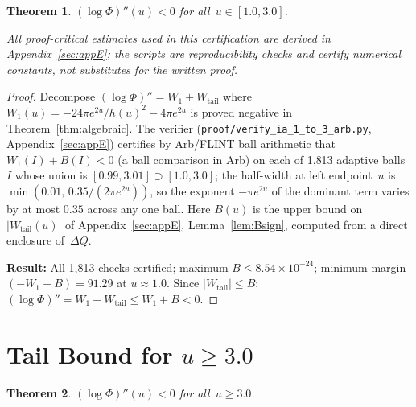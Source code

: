 \documentclass[11pt]{article}
\newtheorem{theorem}{Theorem}
\theoremstyle{definition}
\theoremstyle{remark}
\begin{document}
\begin{theorem}\label{thm:extended}
$(\log\Phi)''(u) < 0$ for all~$u \in [1.0, 3.0]$.

All proof-critical estimates used in this certification are derived in
Appendix~\ref{sec:appE}; the scripts are reproducibility checks and certify
numerical constants, not substitutes for the written proof.
\end{theorem}

\begin{proof}
Decompose $(\log\Phi)'' = W_1 + W_{\mathrm{tail}}$ where
$W_1(u) = -24\pi e^{2u}/h(u)^2 - 4\pi e^{2u}$ is proved negative in
Theorem~\ref{thm:algebraic}.
The verifier
(\texttt{proof/verify\_ia\_1\_to\_3\_arb.py}, Appendix~\ref{sec:appE})
certifies by Arb/FLINT ball arithmetic that
$W_1(I) + B(I) < 0$ (a ball comparison in Arb) on each of 1{,}813
adaptive balls~$I$ whose union is $[0.99,3.01]\supset[1.0,3.0]$;
the half-width at left endpoint~$u$ is
$\min(0.01,\, 0.35/(2\pi e^{2u}))$, so the exponent $-\pi e^{2u}$ of the
dominant term varies by at most $0.35$ across any one ball.
Here $B(u)$ is the upper bound on $|W_{\mathrm{tail}}(u)|$
of Appendix~\ref{sec:appE}, Lemma~\ref{lem:Bsign}, computed from a
direct enclosure of~$\Delta Q$.

\textbf{Result:} All 1{,}813 checks certified; maximum
$B \leq 8.54\times 10^{-24}$;
minimum margin $(-W_1 - B) = 91.29$ at $u\approx1.0$.
Since $|W_{\mathrm{tail}}|\leq B$:
$(\log\Phi)'' = W_1 + W_{\mathrm{tail}} \leq W_1 + B < 0$.
\end{proof}

\section{Tail Bound for $u \geq 3.0$}
\label{sec:tailbound}

\begin{theorem}\label{thm:perturbation_tail}
$(\log\Phi)''(u) < 0$ for all~$u \geq 3.0$.
\end{theorem}
\end{document}
